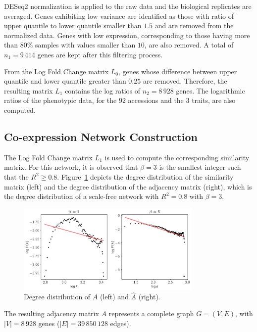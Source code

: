 \documentclass{bmcart}
\begin{document}
DESeq2 normalization is applied to the raw data and the biological
replicates are averaged. Genes exhibiting low variance are
identified as those with ratio of upper quantile to lower quantile
smaller than $1.5$ and are removed from the normalized data. Genes
with low expression, corresponding to those having more than $80\%$
samples with values smaller than $10$, are also removed. A total of
$n_1 = 9\,414$ genes are kept after this filtering process.
\vspace{0.5cm}

From the Log Fold Change matrix $L_0$, genes whose difference between
upper quantile and lower quantile greater than $0.25$ are
removed. Therefore, the resulting matrix $L_1$ contains the log ratios
of $n_2 = 8\,928$ genes. The logarithmic ratios of the phenotypic data,
for the $92$ accessions and the $3$ traits, are also computed.

\subsection*{Co-expression Network Construction}

The Log Fold Change matrix $L_1$ is used to compute the corresponding
similarity matrix.  For this network, it is observed that $\beta=3$ is
the smallest integer such that the $R^2 \geq 0.8
$. Figure~\ref{fig:beta} depicts the degree distribution of the
similarity matrix (left) and the degree distribution of the adjacency
matrix (right), which is the degree distribution of a scale-free
network with $R^2 = 0.8$ with $\beta = 3$.
\vspace{0.5cm}

\begin{figure}[htbp]
  \centering
    \includegraphics[clip,width=0.8\textwidth]{figures/figure2.png}
  \caption{Degree distribution of $A$ (left) and $\hat{A}$ (right).}
  \label{fig:beta}
\end{figure}

The resulting adjacency matrix $A$ represents a complete graph
$G=(V,E)$, with $|V| = 8\,928$ genes ($|E| = 39\,850\,128$ edges).
\end{document}
